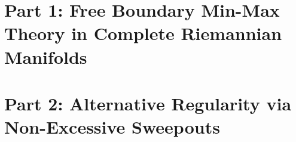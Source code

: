 \documentclass[oneside,numbers=noenddot,headinclude,footinclude,cleardoublepage=empty,abstract=on,BCOR=5mm,paper=letter,fontsize=11pt,headheight=17pt]{scrreprt}
\begin{document}
\frenchspacing
\raggedbottom


\pagestyle{plain}

\cleardoublepage

\cleardoublepage

\cleardoublepage

\cleardoubleevenpage

\clearpage


\cleardoublepage
\pagestyle{scrheadings}
\cleardoublepage
\chapter{Part 1: Free Boundary Min-Max Theory in Complete Riemannian Manifolds}\label{ch:main}







\cleardoublepage
\chapter{Part 2: Alternative Regularity via Non-Excessive Sweepouts}\label{ch:alternative-regularity}







%
\cleardoublepage

\end{document}
